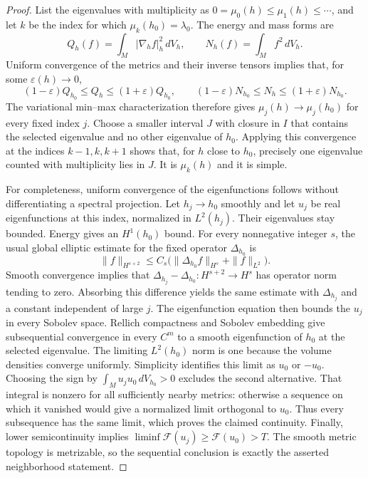 \begin{proof}
List the eigenvalues with multiplicity as
$0=\mu_0(h)\le\mu_1(h)\le\cdots$, and let $k$ be the index
for which $\mu_k(h_0)=\lambda_0$.  The energy and mass forms are
\[
 Q_h(f)=\int_M |\nabla_hf|_h^2\,dV_h,
 \qquad N_h(f)=\int_Mf^2\,dV_h.
\]
Uniform convergence of the metrics and their inverse tensors implies
that, for some $\varepsilon(h)\to0$,
\[
 (1-\varepsilon)Q_{h_0}\le Q_h\le(1+\varepsilon)Q_{h_0},
 \qquad
 (1-\varepsilon)N_{h_0}\le N_h\le(1+\varepsilon)N_{h_0}.
\]
The variational min--max characterization
\cite[Section~7.2]{CanzaniNotes} therefore gives
$\mu_j(h)\to\mu_j(h_0)$ for every fixed index $j$.
Choose a smaller interval $J$ with closure in $I$ that contains the
selected eigenvalue and no other eigenvalue of $h_0$.  Applying this
convergence at the indices $k-1,k,k+1$ shows that, for $h$ close to
$h_0$, precisely one eigenvalue counted with multiplicity lies in
$J$.  It is $\mu_k(h)$ and it is simple.

For completeness, uniform convergence of the eigenfunctions follows
without differentiating a spectral projection.  Let $h_j\to h_0$
smoothly and let $u_j$ be real eigenfunctions at this index, normalized
in $L^2(h_j)$.  Their eigenvalues stay bounded.  Energy gives an
$H^1(h_0)$ bound.  For every nonnegative integer $s$, the usual global
elliptic estimate for the fixed operator $\Delta_{h_0}$
\cite[Theorem~15.7]{DyatlovNotes} is
\[
 \|f\|_{H^{s+2}}
 \le C_s\bigl(\|\Delta_{h_0}f\|_{H^s}+\|f\|_{L^2}\bigr).
\]
Smooth convergence implies that
$\Delta_{h_j}-\Delta_{h_0}:H^{s+2}\to H^s$ has operator norm tending
to zero.  Absorbing this difference yields the same estimate with
$\Delta_{h_j}$ and a constant independent of large $j$.  The
eigenfunction equation then bounds the $u_j$ in every Sobolev space.
Rellich compactness and Sobolev embedding give subsequential
convergence in every $C^m$ to a smooth eigenfunction of $h_0$ at the
selected eigenvalue.  The limiting $L^2(h_0)$ norm is one because
the volume densities converge uniformly.  Simplicity identifies
this limit as $u_0$ or $-u_0$.
Choosing the sign by
$\int_Mu_ju_0\,dV_{h_0}>0$ excludes the second alternative.  That
integral is nonzero for all sufficiently nearby metrics: otherwise
a sequence on which it vanished would give a normalized limit
orthogonal to $u_0$.  Thus every subsequence has the same limit,
which proves the claimed continuity.
Finally, lower semicontinuity implies
$\liminf\mathcal F(u_j)\ge\mathcal F(u_0)>T$.
The smooth metric topology is metrizable, so the sequential conclusion
is exactly the asserted neighborhood statement.
\end{proof}

